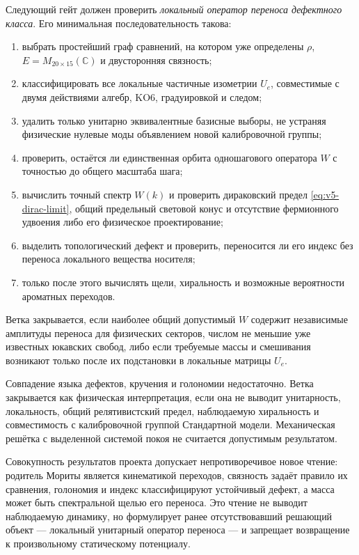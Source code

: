 Следующий гейт должен проверить \emph{локальный оператор переноса
дефектного класса}. Его минимальная последовательность такова:
\begin{enumerate}
 \item выбрать простейший граф сравнений, на котором уже определены
 $\rho$, $E=M_{20\times15}(\mathbb C)$ и двусторонняя связность;
 \item классифицировать все локальные частичные изометрии $U_e$,
 совместимые с двумя действиями алгебр, KO6, градуировкой и следом;
 \item удалить только унитарно эквивалентные базисные выборы, не устраняя
 физические нулевые моды объявлением новой калибровочной группы;
 \item проверить, остаётся ли единственная орбита одношагового оператора
 $W$ с точностью до общего масштаба шага;
 \item вычислить точный спектр $W(k)$ и проверить дираковский предел
 \eqref{eq:v5-dirac-limit}, общий предельный световой конус и отсутствие
 фермионного удвоения либо его физическое проектирование;
 \item выделить топологический дефект и проверить, переносится ли его индекс
 без переноса локального вещества носителя;
 \item только после этого вычислять щели, хиральность и возможные
 вероятности ароматных переходов.
\end{enumerate}

\begin{nogocriterion}
Ветка закрывается, если наиболее общий допустимый $W$ содержит независимые
амплитуды переноса для физических секторов, числом не меньшие уже известных
юкавских свобод, либо если требуемые массы и смешивания возникают только
после их подстановки в локальные матрицы $U_e$.
\end{nogocriterion}

\begin{nogocriterion}
Совпадение языка дефектов, кручения и голономии недостаточно. Ветка
закрывается как физическая интерпретация, если она не выводит унитарность,
локальность, общий релятивистский предел, наблюдаемую хиральность и
совместимость с калибровочной группой Стандартной модели. Механическая
решётка с выделенной системой покоя не считается допустимым результатом.
\end{nogocriterion}

\begin{theorem}
Совокупность результатов проекта допускает непротиворечивое новое чтение:
родитель Мориты является кинематикой переходов, связность задаёт правило их
сравнения, голономия и индекс классифицируют устойчивый дефект, а масса
может быть спектральной щелью его переноса. Это чтение не выводит
наблюдаемую динамику, но формулирует ранее отсутствовавший решающий объект
--- локальный унитарный оператор переноса --- и запрещает возвращение к
произвольному статическому потенциалу.
\end{theorem}

